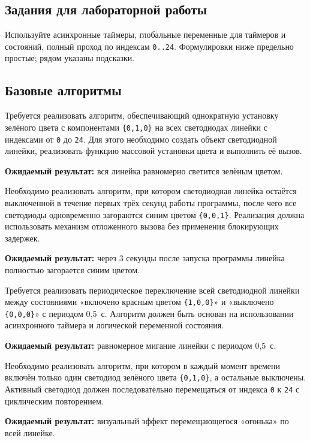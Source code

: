 \subsection{Задания для лабораторной работы}
Используйте асинхронные таймеры, глобальные переменные для таймеров и состояний, полный проход по индексам \verb|0..24|. Формулировки ниже предельно простые; рядом указаны подсказки.
\subsection{Базовые алгоритмы}

\begin{taskbox}
\indent Требуется реализовать алгоритм, обеспечивающий однократную установку зелёного цвета с компонентами \verb|{0,1,0}| на всех светодиодах линейки с индексами от \verb|0| до \verb|24|. Для этого необходимо создать объект светодиодной линейки, реализовать функцию массовой установки цвета и выполнить её вызов.

\noindent\textbf{Ожидаемый результат:} вся линейка равномерно светится зелёным цветом.
\end{taskbox}

\begin{taskbox}
\indent Необходимо реализовать алгоритм, при котором светодиодная линейка остаётся выключенной в течение первых трёх секунд работы программы, после чего все светодиоды одновременно загораются синим цветом \verb|{0,0,1}|. Реализация должна использовать механизм отложенного вызова без применения блокирующих задержек.

\noindent\textbf{Ожидаемый результат:} через 3 секунды после запуска программы линейка полностью загорается синим цветом.
\end{taskbox}

\begin{taskbox}
\indent Требуется реализовать периодическое переключение всей светодиодной линейки между состояниями «включено красным цветом \verb|{1,0,0}|» и «выключено \verb|{0,0,0}|» с периодом 0{,}5~с. Алгоритм должен быть основан на использовании асинхронного таймера и логической переменной состояния.

\noindent\textbf{Ожидаемый результат:} равномерное мигание линейки с периодом 0{,}5~с.
\end{taskbox}

\begin{taskbox}
\indent Необходимо реализовать алгоритм, при котором в каждый момент времени включён только один светодиод зелёного цвета \verb|{0,1,0}|, а остальные выключены. Активный светодиод должен последовательно перемещаться от индекса \verb|0| к \verb|24| с циклическим повторением.

\noindent\textbf{Ожидаемый результат:} визуальный эффект перемещающегося «огонька» по всей линейке.
\end{taskbox}

